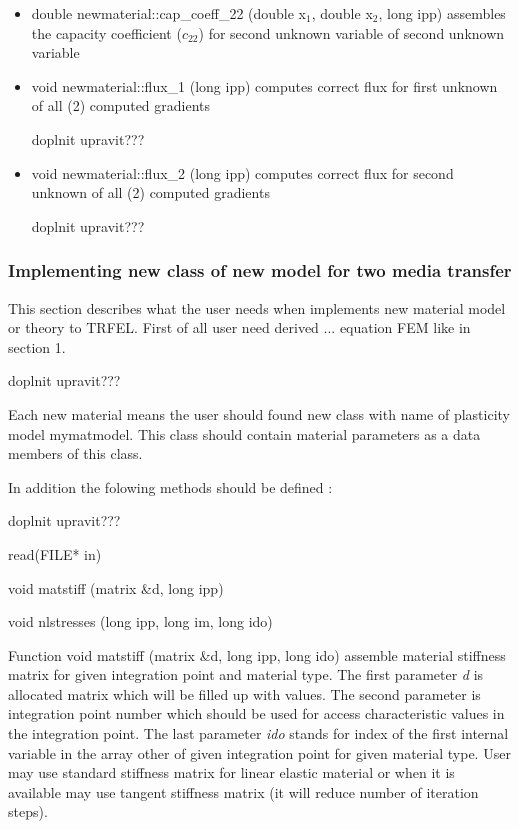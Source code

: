 \begin{itemize}
\item{
{\sf double newmaterial::cap\_coeff\_22 (double x$_1$, double x$_2$, long ipp)}
\newline assembles the capacity coefficient ($c_{22}$) for second unknown variable of second unknown variable
}



\item{
{\sf void newmaterial::flux\_1 (long ipp)}
\newline computes correct flux for first unknown of all (2) computed gradients
}

doplnit upravit???

\item{
{\sf void newmaterial::flux\_2 (long ipp)}
\newline computes correct flux for second unknown of all (2) computed gradients
}

doplnit upravit???


\end{itemize}


\subsubsection {Implementing new class of new model for two media transfer}
This section describes what the user needs when implements new material model or theory
to TRFEL. First of all user need derived ... equation FEM like in section 1.

doplnit upravit???


Each new material means the user should found new class with name of plasticity model {\sf mymatmodel}.
This class should contain material parameters as a data members of this class. 

In addition the folowing methods should be defined :

doplnit upravit???

\begin{itemize}
{\sf
\item
read(FILE* in)
\item
void matstiff (matrix \&d, long ipp)
\item
void nlstresses (long ipp, long im, long ido)
}
\end{itemize}

Function {\sf void matstiff (matrix \&d, long ipp, long ido)} assemble material stiffness matrix for given
integration point and material type. The first parameter {\it d} is allocated matrix which will be
filled up with values. The second parameter is integration point number which should be used for
access characteristic values in the integration point. The last parameter {\it ido} stands for index of the first 
internal variable in the array {\sf other} of given integration point for given material type. User may use standard 
stiffness matrix for linear elastic material or when it is available may use tangent stiffness matrix (it will reduce
number of iteration steps).\\

